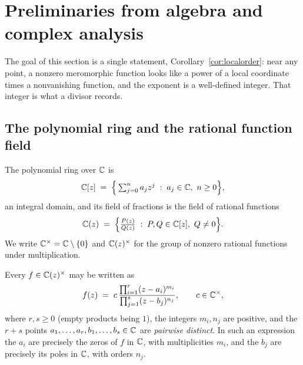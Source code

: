 \section{Preliminaries from algebra and complex analysis}\label{sec:prelim}

The goal of this section is a single statement, Corollary~\ref{cor:localorder}:
near any point, a nonzero meromorphic function looks like a power of a local
coordinate times a nonvanishing function, and the exponent is a well-defined
integer. That integer is what a divisor records.

\subsection{The polynomial ring and the rational function field}

The polynomial ring over $\mathbb{C}$ is
\[
\mathbb{C}[z] \;=\; \Big\{ \textstyle\sum_{j=0}^{n} a_j z^j \;:\; a_j \in \mathbb{C},\ n \geq 0 \Big\},
\]
an integral domain, and its field of fractions is the field of rational functions
\[
\mathbb{C}(z) \;=\; \Big\{ \tfrac{P(z)}{Q(z)} \;:\; P, Q \in \mathbb{C}[z],\ Q \neq 0 \Big\}.
\]
We write $\mathbb{C}^\times = \mathbb{C} \setminus \{0\}$ and $\mathbb{C}(z)^\times$ for the group of
nonzero rational functions under multiplication.

\begin{smjproposition}\label{prop:reduced}
Every $f \in \mathbb{C}(z)^\times$ may be written as
\[
f(z) \;=\; c\, \frac{\prod_{i=1}^{r} (z-a_i)^{m_i}}{\prod_{j=1}^{s} (z-b_j)^{n_j}},
\qquad c \in \mathbb{C}^\times,
\]
where $r, s \geq 0$ (empty products being $1$), the integers $m_i, n_j$ are
positive, and the $r+s$ points $a_1, \dots, a_r, b_1, \dots, b_s \in \mathbb{C}$ are
\emph{pairwise distinct}. In such an expression the $a_i$ are precisely the zeros
of $f$ in $\mathbb{C}$, with multiplicities $m_i$, and the $b_j$ are precisely its poles
in $\mathbb{C}$, with orders $n_j$.
\end{smjproposition}

